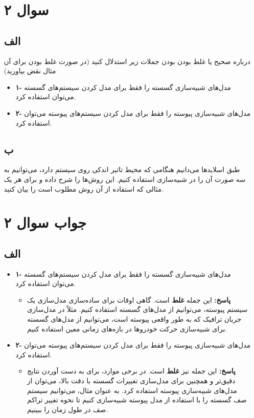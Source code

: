 \section*{سوال ۲}

\subsection*{الف}

درباره صحیح یا غلط بودن بودن جملات زیر استدلال کنید (در صورت غلط بودن برای آن مثال نقض بیاورید)

\begin{itemize}
	\item \textbf{۱-} مدل‌های شبیه‌سازی گسسته را فقط برای مدل کردن سیستم‌های گسسته می‌توان استفاده کرد.
	\item \textbf{۲-} مدل‌های شبیه‌سازی پیوسته را فقط برای مدل کردن سیستم‌های پیوسته می‌توان استفاده کرد.
\end{itemize}

\subsection*{ب}

طبق اسلایدها می‌دانیم هنگامی که محیط تاثیر اندکی روی سیستم دارد، می‌توانیم به سه صورت آن را در شبیه‌سازی استفاده کنیم. این روش‌ها را شرح داده و برای هر یک مثالی که استفاده از آن روش مطلوب است را بیان کنید.

\section*{جواب سوال ۲}

\subsection*{الف}

\begin{itemize}
	\item \textbf{۱-} مدل‌های شبیه‌سازی گسسته را فقط برای مدل کردن سیستم‌های گسسته می‌توان استفاده کرد.
	\begin{itemize}
		\item \textbf{پاسخ:} این جمله \textbf{غلط} است. گاهی اوقات برای ساده‌سازی مدل‌سازی یک سیستم پیوسته، می‌توانیم از مدل‌های گسسته استفاده کنیم. مثلاً در مدل‌سازی جریان ترافیک که به طور واقعی پیوسته است، می‌توانیم از مدل‌های گسسته برای شبیه‌سازی حرکت خودروها در بازه‌های زمانی معین استفاده کنیم.
	\end{itemize}
	\item \textbf{۲-} مدل‌های شبیه‌سازی پیوسته را فقط برای مدل کردن سیستم‌های پیوسته می‌توان استفاده کرد.
	\begin{itemize}
		\item \textbf{پاسخ:} این جمله نیز \textbf{غلط} است. در برخی موارد، برای به دست آوردن نتایج دقیق‌تر و همچنین برای مدل‌سازی تغییرات گسسته با دقت بالا، می‌توان از مدل‌های شبیه‌سازی پیوسته استفاده کرد. به عنوان مثال، می‌توانیم سیستم صف گسسته را با استفاده از مدل پیوسته شبیه‌سازی کنیم تا نحوه تغییر تراکم صف در طول زمان را ببینیم.
	\end{itemize}
\end{itemize}

